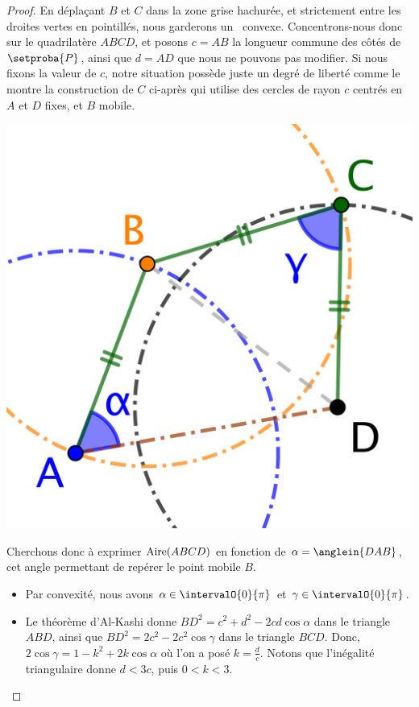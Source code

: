 \begin{proof}
	En déplaçant $B$ et $C$ dans la zone grise hachurée, et strictement entre les droites vertes en pointillés, nous garderons un \ngone\ convexe.
	Concentrons-nous donc sur le quadrilatère $ABCD$, et posons $c = AB$ la longueur commune des côtés de $\setproba{P}$, ainsi que $d = AD$ que nous ne pouvons pas modifier.
	Si nous fixons la valeur de $c$, notre situation possède juste un degré de liberté comme le montre la construction de $C$ ci-après qui utilise des cercles de rayon $c$ centrés en $A$ et $D$ fixes, et $B$ mobile.
	\begin{center}
		\includegraphics[scale=.4]{content/polygon/sol-must-be/2-eq-angles-circle.png}
	\end{center}

	Cherchons donc à exprimer $\mathrm{Aire}(ABCD)$ en fonction de $\alpha = \anglein{DAB}$, cet angle permettant de repérer le point mobile $B$.
	\begin{itemize}
	    \item Par convexité, nous avons $\alpha \in \intervalO{0}{\pi}$ et $\gamma \in \intervalO{0}{\pi}$.


	    \item Le théorème d'Al-Kashi donne
	    $BD^2 = c^2 + d^2 - 2 c d \cos \alpha$ dans le triangle $ABD$,
	    ainsi que
	    $BD^2 = 2 c^2 - 2 c^2 \cos \gamma$ dans le triangle $BCD$.
	    Donc,
	    $2 \cos \gamma = 1 - k^2 + 2 k \cos \alpha$ où l'on a posé $k = \frac{d}{c}$.
	    Notons que l'inégalité triangulaire donne $d < 3 c$, puis $0 < k < 3$.



\end{itemize}
\end{proof}
